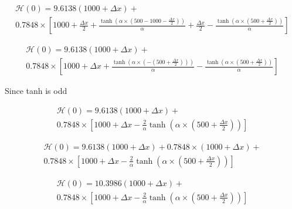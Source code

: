 \documentclass[12pt]{article}
\begin{document}
\begin{multline}
\mathcal{H} (0) = 9.6138(1000 + \Delta x) +  \\ 0.7848\times\left[1000 + \frac{\Delta x}{2} + \frac{\tanh\left(\alpha \times(500 -1000 - \frac{\Delta x}{2})\right)}{\alpha} + \frac{\Delta x}{2} - \frac{\tanh\left(\alpha \times(500 + \frac{\Delta x}{2})\right)}{\alpha}\right]
\end{multline}

\begin{multline}
\mathcal{H} (0) = 9.6138(1000 + \Delta x) +  \\ 0.7848\times\left[1000 + \Delta x + \frac{\tanh\left(\alpha \times(-\left(500 + \frac{\Delta x}{2}\right))\right)}{\alpha} - \frac{\tanh\left(\alpha \times(500 + \frac{\Delta x}{2})\right)}{\alpha}\right]
\end{multline}

Since tanh is odd

\begin{multline}
\mathcal{H} (0) = 9.6138(1000 + \Delta x) +  \\ 0.7848\times\left[1000 + \Delta x - \frac{2}{\alpha}\tanh\left(\alpha \times\left(500 + \frac{\Delta x}{2}\right)\right)\right]
\end{multline}

\begin{multline}
\mathcal{H} (0) = 9.6138(1000 + \Delta x) + 0.7848\times\left(1000 + \Delta x\right) +  \\ 0.7848\times\left[1000 + \Delta x - \frac{2}{\alpha}\tanh\left(\alpha \times\left(500 + \frac{\Delta x}{2}\right)\right)\right]
\end{multline}

\begin{multline}
\mathcal{H} (0) = 10.3986(1000 + \Delta x) +  \\ 0.7848\times\left[1000 + \Delta x - \frac{2}{\alpha}\tanh\left(\alpha \times\left(500 + \frac{\Delta x}{2}\right)\right)\right]
\end{multline}
\end{document}
